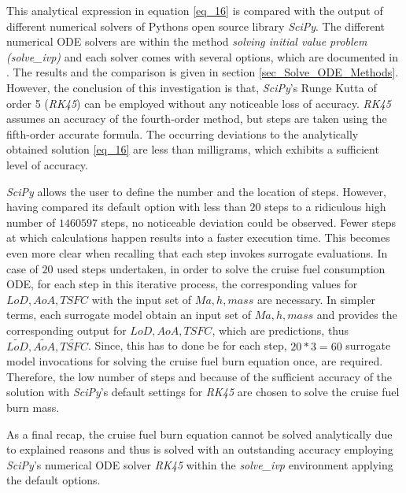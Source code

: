This analytical expression in
equation \eqref{eq_16} is compared with the output of 
different numerical solvers of Pythons 
open source library \emph{SciPy}. The 
different numerical ODE solvers are within the  
method \emph{solving initial value problem}  
\emph{(solve\_ivp)} and each solver comes
with several 
options, which are 
documented in \cite{noauthor_scipys_2021}. 
The results and the comparison 
is given in section \ref{sec_Solve_ODE_Methods}. However,
the conclusion of this investigation is that,  
\emph{SciPy}'s Runge Kutta of 
order 5 (\emph{RK45}) can be employed without any 
noticeable loss of accuracy.
\emph{RK45} assumes an accuracy of the fourth-order
method, but steps are taken using the 
fifth-order accurate formula. The occurring deviations to 
the analytically obtained solution \eqref{eq_16} are less 
than milligrams, which exhibits a sufficient 
level of 
accuracy.\newline


\emph{SciPy} allows the user to define the number 
and the location of steps. However, having compared 
its default option with less than $20$ steps
to a ridiculous high number 
of $1460597$ steps, no noticeable deviation 
could be observed. Fewer steps at which calculations 
happen results into a faster execution time. This 
becomes even more clear when recalling that
each step invokes surrogate  evaluations. In case 
of $20$ used steps undertaken, in order to 
solve the cruise fuel consumption ODE, for 
each step in this iterative process, the 
corresponding values 
for $LoD, AoA, TSFC$ with the
input set of $Ma,h, mass$ are necessary.
In simpler terms, each surrogate model
obtain an input set of $Ma,h, mass$ and 
provides the corresponding output for 
$LoD, AoA, TSFC$, which are predictions, thus 
$\tilde{LoD}, \tilde{AoA}, \tilde{TSFC}$. Since, this has to
done be for each step, $20*3= 60$ surrogate 
model invocations 
for solving the cruise fuel burn equation 
once, are required. Therefore, the low number of steps  
and because of the sufficient accuracy of the solution
with \emph{SciPy}'s default settings for \emph{RK45} are chosen 
to solve the cruise fuel burn mass. \newline


As a final recap, the cruise fuel burn 
equation cannot be solved analytically due to explained reasons 
and thus is solved with an outstanding accuracy employing 
\emph{SciPy}'s numerical ODE solver \emph{RK45} within the 
\emph{solve\_ivp} environment applying the default options.


